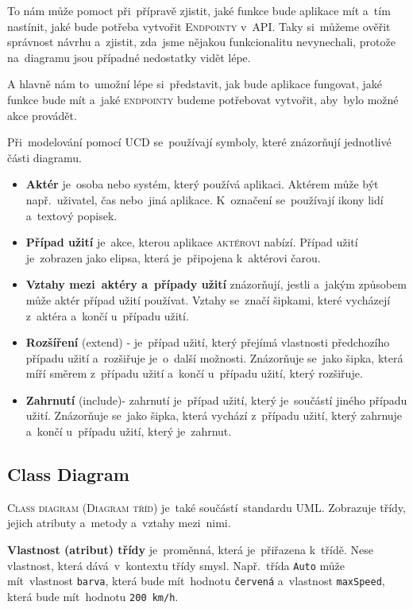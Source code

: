\documentclass[14pt,a4paper]{article}
\begin{document}
        To nám může pomoct při~přípravě zjistit,  jaké funkce bude aplikace mít a~tím nastínit, jaké bude potřeba vytvořit \textsc{Endpointy} v~\textsc{API}.
        Taky si~můžeme ověřit správnost návrhu a~zjistit, zda~jsme nějakou funkcionalitu nevynechali, protože na~diagramu jsou případné nedostatky vidět lépe.
        
        A hlavně nám to~umožní lépe si~představit, jak bude aplikace fungovat, jaké funkce bude mít a~jaké \textsc{endpointy} budeme potřebovat vytvořit, aby~bylo možné akce provádět. \parencite{uml:usecase}

        Při~modelování pomocí \textsc{UCD} se~používají symboly, které znázorňují jednotlivé části diagramu.
        \begin{itemize}
            \item \textbf{Aktér} je~osoba nebo systém, který používá aplikaci. Aktérem může být např.~uživatel, čas nebo~jiná aplikace. K~označení se~používají ikony lidí a~textový popisek.
            \item \textbf{Případ užití} je~akce, kterou aplikace \textsc{aktérovi} nabízí. Případ užití je~zobrazen jako elipsa, která je~připojena k~aktérovi čarou.
            \item \textbf{Vztahy mezi~aktéry a~případy užití} znázorňují, jestli a~jakým způsobem může aktér případ užití používat. Vztahy se~značí šipkami, které vycházejí z~aktéra a~končí u~případu užití.
            \item \textbf{Rozšíření} (extend) - je~případ užití, který přejímá vlastnosti předchozího případu užití a~rozšiřuje je~o~další možnosti. Znázorňuje se~jako šipka, která míří směrem z~případu užití a~končí u~případu užití, který rozšiřuje.
            \item \textbf{Zahrnutí} (include)- zahrnutí je~případ užití, který je~součástí jiného případu užití. Znázorňuje se~jako šipka, která vychází z~případu užití, který zahrnuje a~končí u~případu užití, který je~zahrnut.
        \end{itemize}

        \subsection{Class Diagram}
        \textsc{Class diagram} (\textsc{Diagram tříd}) je~také součástí~standardu \textsc{UML}. Zobrazuje třídy, jejich atributy a~metody a~vztahy mezi~nimi.

        \textbf{Vlastnost (atribut) třídy} je~proměnná, která je~přiřazena k~třídě. Nese vlastnost, která dává~v~kontextu třídy smysl. Např.~třída \texttt{Auto} může mít~vlastnost \texttt{barva}, která bude mít~hodnotu \texttt{červená} a~vlastnost \texttt{maxSpeed}, která bude mít~hodnotu \texttt{200 km/h}.
\end{document}

